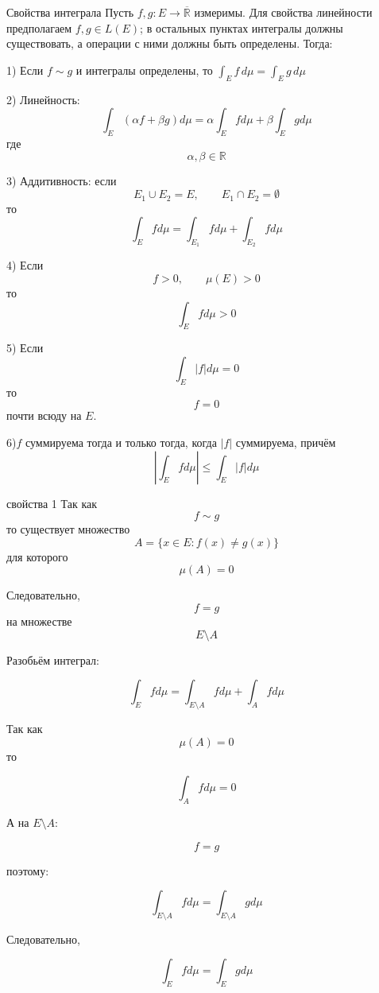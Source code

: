 \documentclass[12pt,a4paper]{article}
\begin{document}
\begin{theorem}{Свойства интеграла}
    Пусть $f,g:E\to\overline{\mathbb{R}}$ измеримы. Для свойства линейности предполагаем $f,g\in L(E)$; в остальных пунктах интегралы должны существовать, а операции с ними должны быть определены. Тогда:

    1) Если $f\sim g$ и интегралы определены, то $\int_E f\,d\mu=\int_E g\,d\mu$


    2) Линейность:
    \[
        \int_E(\alpha f+\beta g) d\mu
        =
        \alpha\int_Ef d\mu
        +
        \beta\int_Eg d\mu
    \]
    где
    \[
        \alpha,\beta\in\mathbb{R}
    \]


    3) Аддитивность:
    если
    \[
        E_1\cup E_2=E,
        \qquad
        E_1\cap E_2=\emptyset
    \]
    то
    \[
        \int_Ef d\mu
        =
        \int_{E_1}f d\mu
        +
        \int_{E_2}f d\mu
    \]


    4) Если
    \[
        f>0,\qquad \mu(E)>0
    \]
    то
    \[
        \int_Ef d\mu>0
    \]


    5) Если
    \[
        \int_E|f| d\mu=0
    \]
    то
    \[
        f=0
    \]
    почти всюду на $E$.


    6)$f$ суммируема тогда и только тогда, когда $|f|$ суммируема, причём
    \[
        \left|
        \int_Ef d\mu
        \right|
        \leq
        \int_E|f| d\mu
    \]

\end{theorem}

\begin{proofbox}{свойства 1}
    Так как
    \[
        f\sim g
    \]
    то существует множество
    \[
        A=\{x\in E:f(x)\neq g(x)\}
    \]
    для которого
    \[
        \mu(A)=0
    \]

    Следовательно,
    \[
        f=g
    \]
    на множестве
    \[
        E\setminus A
    \]

    Разобьём интеграл:

    \[
        \int_E f d\mu
        =
        \int_{E\setminus A}f d\mu
        +
        \int_A f d\mu
    \]

    Так как
    \[
        \mu(A)=0
    \]
    то

    \[
        \int_A f d\mu=0
    \]

    А на \(E\setminus A\):

    \[
        f=g
    \]

    поэтому:

    \[
        \int_{E\setminus A}f d\mu
        =
        \int_{E\setminus A}g d\mu
    \]

    Следовательно,

    \[
        \int_E f d\mu
        =
        \int_E g d\mu
    \]
\end{proofbox}
\end{document}

